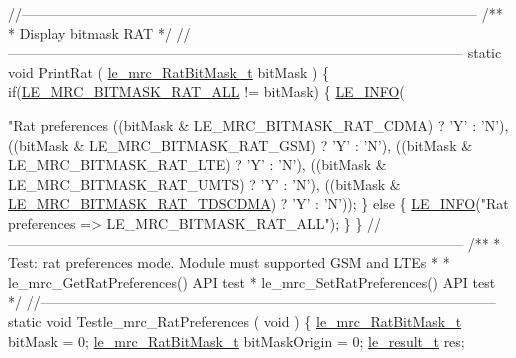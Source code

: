 \begin{DoxyCodeInclude}
\textcolor{comment}{//--------------------------------------------------------------------------------------------------}\textcolor{comment}{}
\textcolor{comment}{/**}
\textcolor{comment}{ * Display bitmask RAT}
\textcolor{comment}{ */}
\textcolor{comment}{//--------------------------------------------------------------------------------------------------}
\textcolor{keyword}{static} \textcolor{keywordtype}{void} PrintRat
(
    \hyperlink{le__mrc__interface_8h_af643c7005da7f2466302eebdf7a29d93}{le\_mrc\_RatBitMask\_t} bitMask
)
\{
    \textcolor{keywordflow}{if}(\hyperlink{le__mrc__interface_8h_af643c7005da7f2466302eebdf7a29d93aa6e87ad274b7f5011413ea0e8375300b}{LE\_MRC\_BITMASK\_RAT\_ALL} != bitMask)
    \{
        \hyperlink{le__log_8h_a23e6d206faa64f612045d688cdde5808}{LE\_INFO}(\textcolor{stringliteral}{"Rat preferences %
            ((bitMask & LE\_MRC\_BITMASK\_RAT\_CDMA) ? \textcolor{charliteral}{'Y'} : \textcolor{charliteral}{'N'}),
            ((bitMask & LE\_MRC\_BITMASK\_RAT\_GSM) ? \textcolor{charliteral}{'Y'} : \textcolor{charliteral}{'N'}),
            ((bitMask & LE\_MRC\_BITMASK\_RAT\_LTE) ? \textcolor{charliteral}{'Y'} : \textcolor{charliteral}{'N'}),
            ((bitMask & LE\_MRC\_BITMASK\_RAT\_UMTS) ? \textcolor{charliteral}{'Y'} : \textcolor{charliteral}{'N'}),
            ((bitMask & \hyperlink{le__mrc__interface_8h_af643c7005da7f2466302eebdf7a29d93a704e1357fc74db4ae2fef1548aa18bcc}{LE\_MRC\_BITMASK\_RAT\_TDSCDMA}) ? \textcolor{charliteral}{'Y'} : \textcolor{charliteral}{'N'}));
    \}
    \textcolor{keywordflow}{else}
    \{
        \hyperlink{le__log_8h_a23e6d206faa64f612045d688cdde5808}{LE\_INFO}(\textcolor{stringliteral}{"Rat preferences => LE\_MRC\_BITMASK\_RAT\_ALL"});
    \}
\}
\textcolor{comment}{//--------------------------------------------------------------------------------------------------}\textcolor{comment}{}
\textcolor{comment}{/**}
\textcolor{comment}{ * Test: rat preferences mode. Module must supported GSM and LTEs}
\textcolor{comment}{ *}
\textcolor{comment}{ * le\_mrc\_GetRatPreferences() API test}
\textcolor{comment}{ * le\_mrc\_SetRatPreferences() API test}
\textcolor{comment}{ */}
\textcolor{comment}{//--------------------------------------------------------------------------------------------------}
\textcolor{keyword}{static} \textcolor{keywordtype}{void} Testle\_mrc\_RatPreferences
(
    \textcolor{keywordtype}{void}
)
\{
    \hyperlink{le__mrc__interface_8h_af643c7005da7f2466302eebdf7a29d93}{le\_mrc\_RatBitMask\_t} bitMask = 0;
    \hyperlink{le__mrc__interface_8h_af643c7005da7f2466302eebdf7a29d93}{le\_mrc\_RatBitMask\_t} bitMaskOrigin = 0;
    \hyperlink{le__basics_8h_a1cca095ed6ebab24b57a636382a6c86c}{le\_result\_t} res;

}
\end{DoxyCodeInclude}
